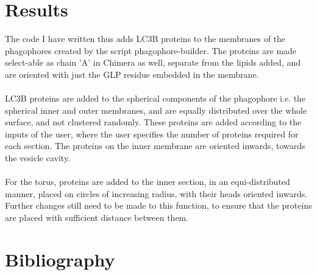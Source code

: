 \documentclass[12pt, a4paper]{report}
\begin{document}
\clearpage
\newpage 
\section*{Results} 

The code I have written thus adds LC3B proteins to the membranes of the phagophores created by the script phagophore-builder. The proteins are made select-able as chain 'A' in Chimera as well, separate from the lipids added, and are oriented with just the GLP residue embedded in the membrane. 
\\~\\
LC3B proteins are added to the spherical components of the phagophore i.e. the spherical inner and outer membranes, and are equally distributed over the whole surface, and not clustered randomly. These proteins are added according to the inputs of the user, where the user specifies the number of proteins required for each section. The proteins on the inner membrane are oriented inwards, towards the vesicle cavity. 
\\~\\
For the torus, proteins are added to the inner section, in an equi-distributed manner, placed on circles of increasing radius, with their heads oriented inwards. Further changes still need to be made to this function, to ensure that the proteins are placed with sufficient distance between them. 

\newpage
\section*{Bibliography} 
\end{document}

